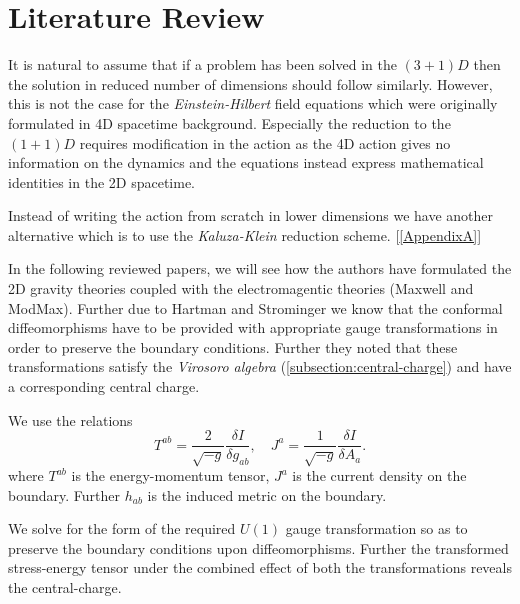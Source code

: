 
\chapter{Literature Review}

\label{Chapter2}


It is natural to assume that if a problem has been solved in the $\left(3+1  \right) D$ then the solution in reduced number of dimensions should follow similarly. However, this is not the case for the \textit{Einstein-Hilbert} field equations which were originally formulated in 4D spacetime background. Especially the reduction to the $\left( 1+1 \right) D$ requires modification in the action as the 4D action gives no information on the dynamics and the equations instead express mathematical identities in the 2D spacetime.

Instead of writing the action from scratch in lower dimensions we have another alternative which is to use the \textit{Kaluza-Klein} reduction scheme. [\ref{AppendixA}]

In the following reviewed papers, we will see how the authors have formulated the 2D gravity theories coupled with the electromagentic theories (Maxwell and ModMax). Further due to Hartman and Strominger \cite{Hartman:2008dq} we know that the conformal diffeomorphisms have to be provided with appropriate gauge transformations in order to preserve the boundary conditions. Further they noted that these transformations satisfy the \textit{Virosoro algebra} (\ref{subsection:central-charge}) and have a corresponding central charge.

We use the relations 
\begin{equation}
    T^{ab} = \frac{2}{\sqrt{-g}} \frac{\delta I}{\delta g_{ab}}, \quad J^a = \frac{1}{\sqrt{-g}} \frac{\delta I}{\delta A_a}.
\end{equation}
where $T^{ab}$ is the energy-momentum tensor, $J^a$ is the current density on the boundary. Further $h_{ab}$ is the induced metric on the boundary. 

We solve for the form of the required $U(1)$ gauge transformation so as to preserve the boundary conditions upon diffeomorphisms. Further the transformed stress-energy tensor under the combined effect of both the transformations reveals the central-charge. 

